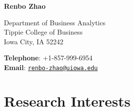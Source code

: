 \documentclass[11pt]{article}
\begin{document}
 
\begin{center}
\textbf{\large Renbo Zhao}\\
\end{center}

\begin{minipage}[t]{0.5\textwidth}
Department of Business Analytics\\
Tippie College of Business\\
Iowa City, IA 52242\\
\end{minipage}
\hspace{.5cm}
\begin{minipage}[t]{0.5\textwidth}
\textbf{Telephone}: +1-857-999-6954\\
\textbf{Email}: \href{mailto:}{\tt renbo-zhao@uiowa.edu}\\
\end{minipage} \newline\newline


\vspace{-1em}
\setlength{\leftskip}{3ex}

\section*{\large Research Interests}
\end{document}
